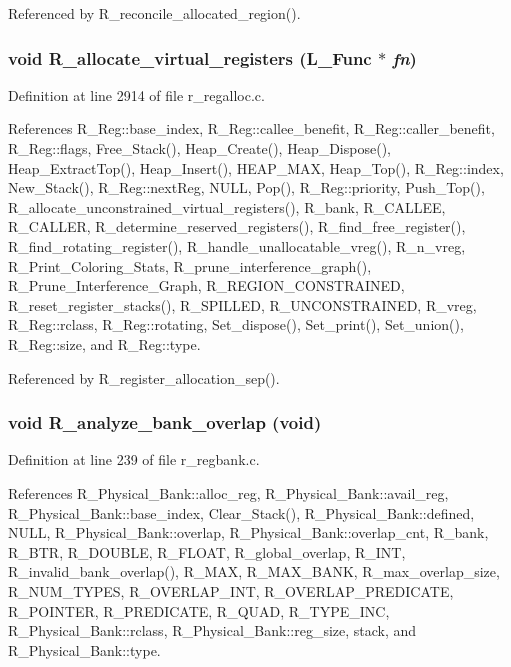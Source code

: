 Referenced by R\_\-reconcile\_\-allocated\_\-region().
\subsubsection{\setlength{\rightskip}{0pt plus 5cm}void R\_\-allocate\_\-virtual\_\-registers (L\_\-Func $\ast$ {\em fn})}\label{r__regproto_8h_b99ed1308f1ddc6f004858871fd65276}




Definition at line 2914 of file r\_\-regalloc.c.

References R\_\-Reg::base\_\-index, R\_\-Reg::callee\_\-benefit, R\_\-Reg::caller\_\-benefit, R\_\-Reg::flags, Free\_\-Stack(), Heap\_\-Create(), Heap\_\-Dispose(), Heap\_\-Extract\-Top(), Heap\_\-Insert(), HEAP\_\-MAX, Heap\_\-Top(), R\_\-Reg::index, New\_\-Stack(), R\_\-Reg::next\-Reg, NULL, Pop(), R\_\-Reg::priority, Push\_\-Top(), R\_\-allocate\_\-unconstrained\_\-virtual\_\-registers(), R\_\-bank, R\_\-CALLEE, R\_\-CALLER, R\_\-determine\_\-reserved\_\-registers(), R\_\-find\_\-free\_\-register(), R\_\-find\_\-rotating\_\-register(), R\_\-handle\_\-unallocatable\_\-vreg(), R\_\-n\_\-vreg, R\_\-Print\_\-Coloring\_\-Stats, R\_\-prune\_\-interference\_\-graph(), R\_\-Prune\_\-Interference\_\-Graph, R\_\-REGION\_\-CONSTRAINED, R\_\-reset\_\-register\_\-stacks(), R\_\-SPILLED, R\_\-UNCONSTRAINED, R\_\-vreg, R\_\-Reg::rclass, R\_\-Reg::rotating, Set\_\-dispose(), Set\_\-print(), Set\_\-union(), R\_\-Reg::size, and R\_\-Reg::type.

Referenced by R\_\-register\_\-allocation\_\-sep().
\subsubsection{\setlength{\rightskip}{0pt plus 5cm}void R\_\-analyze\_\-bank\_\-overlap (void)}\label{r__regproto_8h_be0fcd246b90863ed5c894f143caf432}




Definition at line 239 of file r\_\-regbank.c.

References R\_\-Physical\_\-Bank::alloc\_\-reg, R\_\-Physical\_\-Bank::avail\_\-reg, R\_\-Physical\_\-Bank::base\_\-index, Clear\_\-Stack(), R\_\-Physical\_\-Bank::defined, NULL, R\_\-Physical\_\-Bank::overlap, R\_\-Physical\_\-Bank::overlap\_\-cnt, R\_\-bank, R\_\-BTR, R\_\-DOUBLE, R\_\-FLOAT, R\_\-global\_\-overlap, R\_\-INT, R\_\-invalid\_\-bank\_\-overlap(), R\_\-MAX, R\_\-MAX\_\-BANK, R\_\-max\_\-overlap\_\-size, R\_\-NUM\_\-TYPES, R\_\-OVERLAP\_\-INT, R\_\-OVERLAP\_\-PREDICATE, R\_\-POINTER, R\_\-PREDICATE, R\_\-QUAD, R\_\-TYPE\_\-INC, R\_\-Physical\_\-Bank::rclass, R\_\-Physical\_\-Bank::reg\_\-size, stack, and R\_\-Physical\_\-Bank::type.

